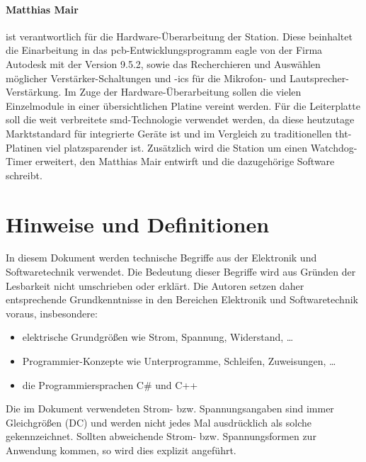 \paragraph{Matthias Mair} ist verantwortlich für die Hardware-Überarbeitung der Station.
Diese beinhaltet die Einarbeitung in das \ac{pcb}-Entwicklungsprogramm \ac{eagle} von der Firma Autodesk mit der Version 9.5.2, sowie das Recherchieren und Auswählen möglicher Verstärker-Schaltungen und -\acp{ic} für die Mikrofon- und Lautsprecher-Verstär\-kung.
Im Zuge der Hardware-Überarbeitung sollen die vielen Einzelmodule in einer übersichtlichen Platine vereint werden.
Für die Leiterplatte soll die weit verbreitete \ac{smd}-Technologie verwendet werden, da diese heutzutage Marktstandard für integrierte Geräte ist und im Vergleich zu traditionellen \ac{tht}-Platinen viel platzsparender ist.
Zusätzlich wird die Station um einen Watchdog-Timer erweitert, den Matthias Mair entwirft und die dazugehörige Software schreibt.

\section{Hinweise und Definitionen}
In diesem Dokument werden technische Begriffe aus der Elektronik und Softwaretechnik verwendet.
Die Bedeutung dieser Begriffe wird aus Gründen der Lesbarkeit nicht umschrieben oder erklärt.
Die Autoren setzen daher entsprechende Grundkenntnisse in den Bereichen Elektronik und Softwaretechnik voraus, insbesondere: 
\begin{itemize}
    \item elektrische Grundgrößen wie Strom, Spannung, Widerstand, \dots
    \item Programmier-Konzepte wie Unterprogramme, Schleifen, Zuweisungen, \dots
    \item die Programmiersprachen C\# und C++
\end{itemize}
Die im Dokument verwendeten Strom- bzw. Spannungsangaben sind immer Gleichgrößen (DC) und werden nicht jedes Mal ausdrücklich als solche gekennzeichnet. Sollten abweichende Strom- bzw. Spannungsformen zur Anwendung kommen, so wird dies explizit angeführt.